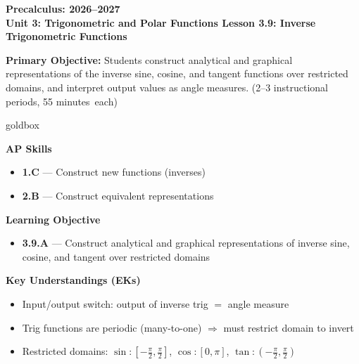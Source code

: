 \documentclass[10pt]{article}
\newcommand{\CourseName}{Precalculus}
\newcommand{\SchoolYear}{2026--2027}
\newcommand{\MeetingLength}{55 minutes}
\newcommand{\UnitNumberName}{Unit 3: Trigonometric and Polar Functions \quad}
\newcommand{\LessonNumberName}{Lesson 3.9: Inverse Trigonometric Functions}
\begin{document}
\begin{center}
    {\Large\bfseries \CourseName: \SchoolYear \\
    {\small\bfseries \UnitNumberName \LessonNumberName}}
\end{center}

\begin{tcolorbox}[colback=sky, colframe=navy, boxrule=0.9pt, arc=2mm,
    left=2mm, right=2mm, top=1.5mm, bottom=1.5mm]
    \textbf{Primary Objective:} Students construct analytical and graphical
    representations of the inverse sine, cosine, and tangent functions over
    restricted domains, and interpret output values as angle measures.
    (2--3 instructional periods, \MeetingLength\ each)
\end{tcolorbox}

\renewcommand{\arraystretch}{1.6}
\begin{skillbox}{goldbox}
\begin{minipage}[t]{0.54\linewidth}\vspace{0pt}
    \textbf{AP Skills}
    \begin{itemize}[leftmargin=1.4em, itemsep=2pt]
        \item \textbf{1.C} --- Construct new functions (inverses)
        \item \textbf{2.B} --- Construct equivalent representations
    \end{itemize}
    \textbf{Learning Objective}
    \begin{itemize}[leftmargin=1.4em, itemsep=2pt]
        \item \textbf{3.9.A} --- Construct analytical and graphical
              representations of inverse sine, cosine, and tangent over
              restricted domains
    \end{itemize}
\end{minipage}\hfill
\begin{minipage}[t]{0.42\linewidth}\vspace{0pt}
    \textbf{Key Understandings (EKs)}
    \begin{itemize}[leftmargin=1.4em, itemsep=2pt]
        \item Input/output switch: output of inverse trig $=$ angle measure
        \item Trig functions are periodic (many-to-one) $\Rightarrow$ must
              restrict domain to invert
        \item Restricted domains: $\sin\colon[-\tfrac{\pi}{2},\tfrac{\pi}{2}]$,
              $\cos\colon[0,\pi]$, $\tan\colon(-\tfrac{\pi}{2},\tfrac{\pi}{2})$
    \end{itemize}
\end{minipage}
\end{skillbox}
\end{document}
